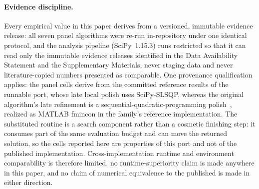 \paragraph{Evidence discipline.}
Every empirical value in this paper derives from a versioned, immutable
evidence release: all seven
panel algorithms were re-run in-repository under one identical
protocol, and the analysis pipeline
(SciPy~1.15.3) runs
restricted so that it can read only the immutable evidence releases
identified in the Data Availability Statement and the Supplementary
Materials, never staging data and never
literature-copied numbers
presented as comparable.
One provenance qualification applies: the \egsk{} panel cells derive
from the committed reference results of the runnable \egsk{} port,
whose late local polish uses SciPy-SLSQP, whereas the original
algorithm's late refinement is a sequential-quadratic-programming
polish~\cite{jawad2024egsk}, realized as MATLAB fmincon in the family's
reference implementation. The substituted routine is a search
component rather than a cosmetic finishing step: it consumes part of the
same evaluation budget and can move the returned solution, so the \egsk{}
cells reported here are properties of this port and not of the published
implementation. Cross-implementation runtime and environment comparability
is therefore limited, no runtime-superiority claim is made anywhere in this
paper, and no claim of numerical equivalence to the published \egsk{} is
made in either direction.

